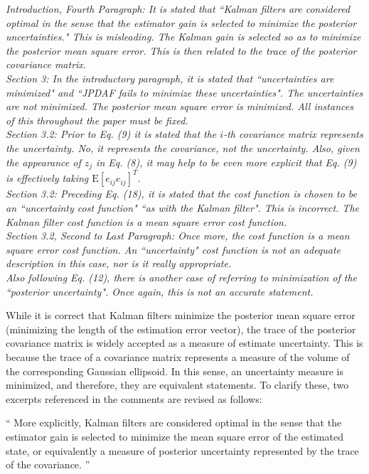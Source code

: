 \documentclass[11pt]{article}
\newenvironment{correction}{\begin{list}{}{\setlength{\leftmargin}{1cm}\setlength{\rightmargin}{1cm}}\vspace{\parsep}\item[]``}{''\end{list}}
\begin{document}
\begin{itemize}
\item {\itshape Introduction, Fourth Paragraph:
It is stated that ``Kalman filters are considered optimal in the sense that the estimator gain is selected to minimize the posterior uncertainties." This is misleading. The Kalman gain is selected so as to minimize the posterior mean square error.  This is then related to the trace of the posterior covariance matrix.
\\
Section 3:
In the introductory paragraph, it is stated that ``uncertainties are minimized" and ``JPDAF fails to minimize these uncertainties".  The uncertainties are not minimized.  The posterior mean square error is minimized.  All instances of this throughout the paper must be fixed.
\\
Section 3.2:
Prior to Eq. (9) it is stated that the $i$-th covariance matrix represents the uncertainty.  No, it represents the covariance, not the uncertainty.  Also, given the appearance of $z_j$ in Eq. (8), it may help to be even more explicit that Eq. (9) is effectively taking $\text{E}[e_{ij}e_{ij}]^{T}$.
\\
Section 3.2:
Preceding Eq. (18), it is stated that the cost function is chosen to be an ``uncertainty cost function" ``as with the Kalman filter".  This is incorrect.  The Kalman filter cost function is a mean square error cost function.
\\
Section 3.2, Second to Last Paragraph:
Once more, the cost function is a mean square error cost function.  An ``uncertainty" cost function is not an adequate description in this case, nor is it really appropriate.
\\
Also following Eq. (12), there is another case of referring to minimization of the ``posterior uncertainty".  Once again, this is not an accurate statement.
}

While it is correct that Kalman filters minimize the posterior mean square error (minimizing the length of the estimation error vector), the trace of the posterior covariance matrix is widely accepted as a measure of estimate uncertainty. This is because the trace of a covariance matrix represents a measure of the volume of the corresponding Gaussian ellipsoid. In this sense, an uncertainty measure is minimized, and therefore, they are equivalent statements. To clarify these, two excerpts referenced in the comments are revised as follows:


\begin{correction}
More explicitly, Kalman filters are considered optimal in the sense that the estimator gain is selected to minimize the mean square error of the estimated state, or equivalently a measure of posterior uncertainty represented by the trace of the covariance.
\end{correction}


\end{itemize}
\end{document}

